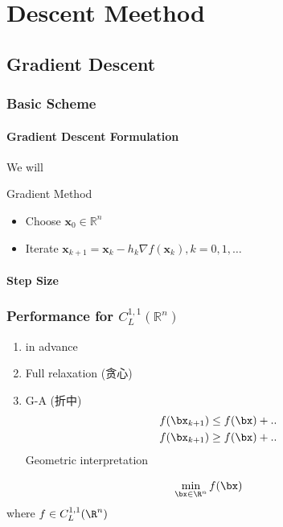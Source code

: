 \newpage
\section{Descent Meethod}
\subsection{Gradient Descent}
\subsubsection{Basic Scheme}

\paragraph{Gradient Descent Formulation}We will 

Gradient Method
\begin{itemize}
    \item Choose $\bm x_0\in \mathbb{R}^n$
    \item Iterate $\bm x_{k+1}=\bm x_k-h_k\nabla f(\bm x_k),k=0,1,\dots$
\end{itemize}

\paragraph{Step Size}\quad 

\subsubsection{Performance for \texorpdfstring{$C_L^{1,1}(\mathbb{R}^n)$}. }

\begin{enumerate}
    \item in advance
    \item Full relaxation (贪心)
    \item G-A (折中)
    \begin{align*}
        f(\bx_{k+1})\le f(\bx)+ ..\\
        f(\bx_{k+1})\ge f(\bx)+ ..\\
    \end{align*}
    \subitem Geometric interpretation
\end{enumerate}


\begin{align*}
    \min_{\bx\in\R^n}f(\bx)
\end{align*}
where $f\in C_L^{1,1}(\R^n)$

